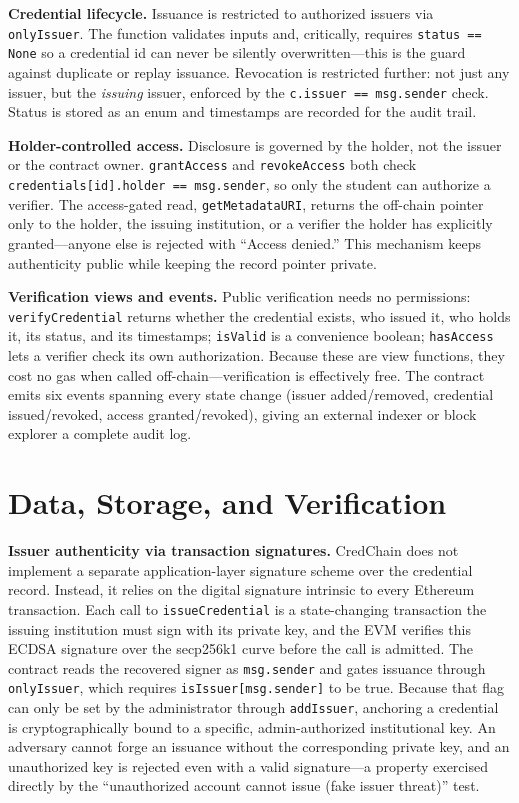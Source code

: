 \documentclass[conference]{IEEEtran}
\begin{document}
\textbf{Credential lifecycle.} Issuance is restricted to authorized issuers via \texttt{onlyIssuer}. The function validates inputs and, critically, requires \texttt{status == None} so a credential id can never be silently overwritten---this is the guard against duplicate or replay issuance. Revocation is restricted further: not just any issuer, but the \emph{issuing} issuer, enforced by the \texttt{c.issuer == msg.sender} check. Status is stored as an enum and timestamps are recorded for the audit trail.

\textbf{Holder-controlled access.} Disclosure is governed by the holder, not the issuer or the contract owner. \texttt{grantAccess} and \texttt{revokeAccess} both check \texttt{credentials[id].holder == msg.sender}, so only the student can authorize a verifier. The access-gated read, \texttt{getMetadataURI}, returns the off-chain pointer only to the holder, the issuing institution, or a verifier the holder has explicitly granted---anyone else is rejected with ``Access denied.'' This mechanism keeps authenticity public while keeping the record pointer private.

\textbf{Verification views and events.} Public verification needs no permissions: \texttt{verifyCredential} returns whether the credential exists, who issued it, who holds it, its status, and its timestamps; \texttt{isValid} is a convenience boolean; \texttt{hasAccess} lets a verifier check its own authorization. Because these are view functions, they cost no gas when called off-chain---verification is effectively free. The contract emits six events spanning every state change (issuer added/removed, credential issued/revoked, access granted/revoked), giving an external indexer or block explorer a complete audit log.

\section{Data, Storage, and Verification}

\textbf{Issuer authenticity via transaction signatures.} CredChain does not implement a separate application-layer signature scheme over the credential record. Instead, it relies on the digital signature intrinsic to every Ethereum transaction. Each call to \texttt{issueCredential} is a state-changing transaction the issuing institution must sign with its private key, and the EVM verifies this ECDSA signature over the secp256k1 curve before the call is admitted. The contract reads the recovered signer as \texttt{msg.sender} and gates issuance through \texttt{onlyIssuer}, which requires \texttt{isIssuer[msg.sender]} to be true. Because that flag can only be set by the administrator through \texttt{addIssuer}, anchoring a credential is cryptographically bound to a specific, admin-authorized institutional key. An adversary cannot forge an issuance without the corresponding private key, and an unauthorized key is rejected even with a valid signature---a property exercised directly by the ``unauthorized account cannot issue (fake issuer threat)'' test.
\end{document}
